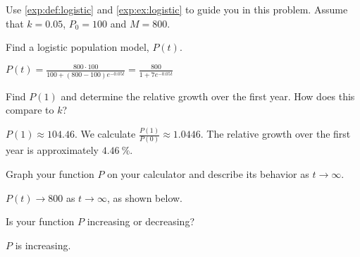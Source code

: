 \begin{exercises}
\begin{problem}
Use \cref{exp:def:logistic} and \cref{exp:ex:logistic} to guide you in this 
problem. Assume that $k=0.05$, $P_0=100$ and $M=800$.
\begin{subproblem}
	Find a logistic population model, $P(t)$.
	\begin{shortsolution}
		$P(t) = \frac{800\cdot 100}{100+(800-100)e^{-0.05t}}=\frac{800}{1+7e^{-0.05t}}$
	\end{shortsolution}
\end{subproblem}
\begin{subproblem}
	Find $P(1)$ and determine the relative growth over the first year.  How does this compare to $k$?
	\begin{shortsolution}
		$P(1)\approx 104.46$. We calculate $\frac{P(1)}{P(0)}\approx 1.0446$. The 
		relative growth over the first year is approximately $\SI{4.46}{\percent}$.
	\end{shortsolution}
\end{subproblem}
\begin{subproblem}
	Graph your function $P$ on your calculator and describe its behavior as $t\to\infty$.
	\begin{shortsolution}
		$P(t)\to 800$ as $t\to\infty$, as shown below.
																			
	\end{shortsolution}
\end{subproblem}
\begin{subproblem}
	Is your function $P$ increasing or decreasing?
	\begin{shortsolution}
		$P$ is increasing.
	\end{shortsolution}
\end{subproblem}
\end{problem}
			

\end{exercises}
